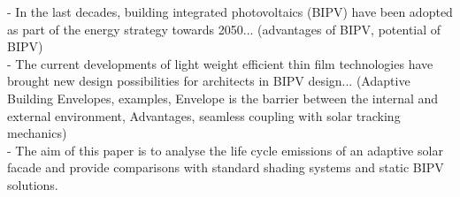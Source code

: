 
- In the last decades, building integrated photovoltaics (BIPV) have been adopted as part of the energy strategy towards 2050... (advantages of BIPV, potential of BIPV)\\

- The current developments of light weight efficient thin film technologies have brought new design possibilities for architects in BIPV design... (Adaptive Building Envelopes, examples, Envelope is the barrier between the internal and external environment, Advantages, seamless coupling with solar tracking mechanics) \\

- The aim of this paper is to analyse the life cycle emissions of an adaptive solar facade and provide comparisons with standard shading systems and static BIPV solutions.\\